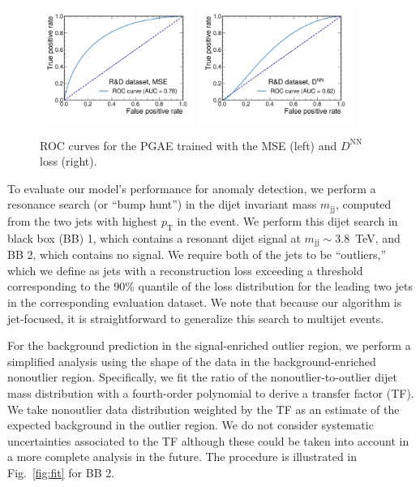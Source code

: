 \documentclass[letterpaper,11pt]{article}
\newcommand{\pt}{\ensuremath{p_{\mathrm{T}}}\xspace}
\begin{document}
\begin{figure}
    \centering
    \includegraphics[width=0.45\textwidth]{figures/gae_mse/roc.pdf}
    \includegraphics[width=0.45\textwidth]{figures/gae_sparseloss/roc.pdf}
    \caption{ROC curves for the PGAE trained with the MSE (left) and $D^\mathrm{NN}$ loss (right).}
    \label{fig:rocs}
\end{figure}

To evaluate our model's performance for anomaly detection, we perform a resonance search (or ``bump hunt'') in the dijet invariant mass $m_\mathrm{jj}$, computed from the two jets with highest $\pt$ in the event. 
We perform this dijet search in black box (BB) 1, which contains a resonant dijet signal at $m_\mathrm{jj}\sim 3.8$~TeV, and BB 2, which contains no signal.
We require both of the jets to be ``outliers,'' which we define as jets with a reconstruction loss exceeding a threshold corresponding to the 90\% quantile of the loss distribution for the leading two jets in the corresponding evaluation dataset.
We note that because our algorithm is jet-focused, it is straightforward to generalize this search to multijet events.


For the background prediction in the signal-enriched outlier region, we perform a simplified analysis using the shape of the data in the background-enriched nonoutlier region.
Specifically, we fit the ratio of the nonoutlier-to-outlier dijet mass distribution with a fourth-order polynomial to derive a transfer factor (TF).
We take nonoutlier data distribution weighted by the TF as an estimate of the expected background in the outlier region. 
We do not consider systematic uncertainties associated to the TF although these could be taken into account in a more complete analysis in the future.
The procedure is illustrated in Fig.~\ref{fig:fit} for BB 2.
\end{document}
